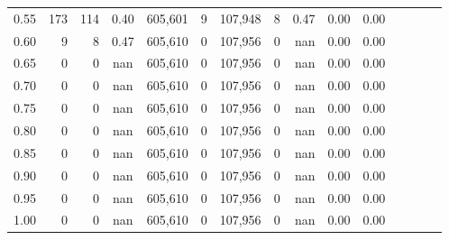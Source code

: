 \begin{tabular}{rrrcrrrrrrrrrrr}
0.55 &      173 &     114 &                                       0.40 &  605,601 &        9 &  107,948 &        8 &  0.47 &  0.00 &                         0.00 \\
0.60 &        9 &       8 &                                       0.47 &  605,610 &        0 &  107,956 &        0 &   nan &  0.00 &                         0.00 \\
0.65 &        0 &       0 &                                        nan &  605,610 &        0 &  107,956 &        0 &   nan &  0.00 &                         0.00 \\
0.70 &        0 &       0 &                                        nan &  605,610 &        0 &  107,956 &        0 &   nan &  0.00 &                         0.00 \\
0.75 &        0 &       0 &                                        nan &  605,610 &        0 &  107,956 &        0 &   nan &  0.00 &                         0.00 \\
0.80 &        0 &       0 &                                        nan &  605,610 &        0 &  107,956 &        0 &   nan &  0.00 &                         0.00 \\
0.85 &        0 &       0 &                                        nan &  605,610 &        0 &  107,956 &        0 &   nan &  0.00 &                         0.00 \\
0.90 &        0 &       0 &                                        nan &  605,610 &        0 &  107,956 &        0 &   nan &  0.00 &                         0.00 \\
0.95 &        0 &       0 &                                        nan &  605,610 &        0 &  107,956 &        0 &   nan &  0.00 &                         0.00 \\
1.00 &        0 &       0 &                                        nan &  605,610 &        0 &  107,956 &        0 &   nan &  0.00 &                         0.00 \\
\bottomrule
\end{tabular}
